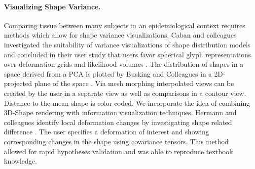 \documentclass[journal]{style/vgtc} 			          %
\begin{document}
\paragraph{Visualizing Shape Variance.}
Comparing tissue between many subjects in an epidemiological context requires methods which allow for shape variance visualizations.
%
Caban and colleagues investigated the suitability of variance visualizations of shape distribution models and concluded in their user study that users favor spherical glyph representations over deformation grids and likelihood volumes \cite{Caban2011}.
%
The distribution of shapes in a space derived from a PCA is plotted by Busking and Colleagues in a 2D-projected plane of the space \cite{Busking2010a}.
%
Via mesh morphing interpolated views can be created by the user in a separate view as well as comparisons in a contour view.
%
Distance to the mean shape is color-coded.
%
We incorporate the idea of combining 3D-Shape rendering with information visualization techniques.
%
%
%
Hermann and colleagues identify local deformation changes by investigating shape related difference \cite{Hermann2014}. 
%
The user specifies a deformation of interest and showing corresponding changes in the shape using covariance tensors.
%
This method allowed for rapid hypotheses validation and was able to reproduce textbook knowledge.
%
%
%

\end{document}
